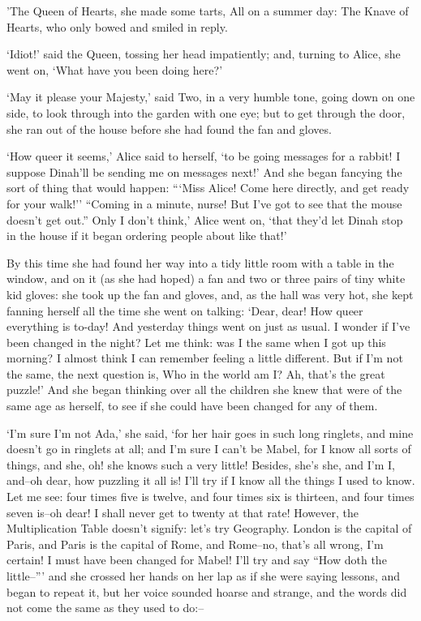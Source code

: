 \documentclass[statementpaper,twoside,openany]{memoir}
\begin{document}
'The Queen of Hearts, she made some tarts, All on a summer day: The Knave of Hearts, who only bowed and smiled in reply.

`Idiot!' said the Queen, tossing her head impatiently; and, turning to Alice, she went on, `What have you been doing here?'

`May it please your Majesty,' said Two, in a very humble tone, going down on one side, to look through into the garden with one eye; but to get through the door, she ran out of the house before she had found the fan and gloves.

`How queer it seems,' Alice said to herself, `to be going messages for a rabbit! I suppose Dinah'll be sending me on messages next!' And she began fancying the sort of thing that would happen: ```Miss Alice! Come here directly, and get ready for your walk!'' ``Coming in a minute, nurse! But I've got to see that the mouse doesn't get out.'' Only I don't think,' Alice went on, `that they'd let Dinah stop in the house if it began ordering people about like that!'

By this time she had found her way into a tidy little room with a table in the window, and on it (as she had hoped) a fan and two or three pairs of tiny white kid gloves: she took up the fan and gloves, and, as the hall was very hot, she kept fanning herself all the time she went on talking: `Dear, dear! How queer everything is to-day! And yesterday things went on just as usual. I wonder if I've been changed in the night? Let me think: was I the same when I got up this morning? I almost think I can remember feeling a little different. But if I'm not the same, the next question is, Who in the world am I? Ah, that's the great puzzle!' And she began thinking over all the children she knew that were of the same age as herself, to see if she could have been changed for any of them.

`I'm sure I'm not Ada,' she said, `for her hair goes in such long ringlets, and mine doesn't go in ringlets at all; and I'm sure I can't be Mabel, for I know all sorts of things, and she, oh! she knows such a very little! Besides, she's she, and I'm I, and--oh dear, how puzzling it all is! I'll try if I know all the things I used to know. Let me see: four times five is twelve, and four times six is thirteen, and four times seven is--oh dear! I shall never get to twenty at that rate! However, the Multiplication Table doesn't signify: let's try Geography. London is the capital of Paris, and Paris is the capital of Rome, and Rome--no, that's all wrong, I'm certain! I must have been changed for Mabel! I'll try and say ``How doth the little--''' and she crossed her hands on her lap as if she were saying lessons, and began to repeat it, but her voice sounded hoarse and strange, and the words did not come the same as they used to do:--
\end{document}
